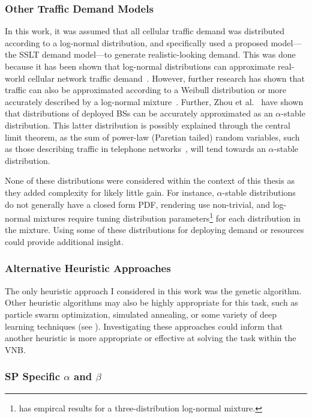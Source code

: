 \documentclass[12pt,dvipsnames]{report}
\begin{document}
\subsubsection{Other Traffic Demand Models}

In this work, it was assumed that all cellular traffic demand was distributed according to a log-normal distribution, and specifically used a proposed model---the SSLT demand model---to generate realistic-looking demand.  This was done because it has been shown that log-normal distributions can approximate real-world cellular network traffic demand~\cite{686105}.  However, further research has shown that traffic can also be approximated according to a Weibull distribution or more accurately described by a log-normal mixture~\cite{5936263, 6757900}.  Further, Zhou et al.~\cite{7202841} have shown that distributions of deployed BSs can be accurately approximated as an $\alpha$-stable distribution.  This latter distribution is possibly explained through the central limit theorem, as the sum of power-law (Paretian tailed) random variables, such as those describing traffic in telephone networks~\cite{PhysRevE.72.026116}, will tend towards an $\alpha$-stable distribution.

None of these distributions were considered within the context of this thesis as they added complexity for likely little gain.  For instance, $\alpha$-stable distributions do not generally have a closed form PDF, rendering use non-trivial, and log-normal mixtures require tuning distribution parameters\footnote{\cite{6757900} has empircal results for a three-distribution log-normal mixture.} for each distribution in the mixture.  Using some of these distributions for deploying demand or resources could provide additional insight.

\subsubsection{Alternative Heuristic Approaches}

The only heuristic approach I considered in this work was the genetic algorithm.  Other heuristic algorithms may also be highly appropriate for this task, such as particle swarm optimization, simulated annealing, or some variety of deep learning techniques (see ).  Investigating these approaches could inform that another heuristic is more appropriate or effective at solving the task within the VNB.

\subsubsection{SP Specific $\alpha$ and $\beta$}
\end{document}
